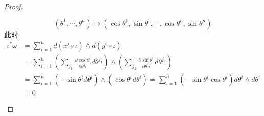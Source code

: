 \documentclass[../main.tex]{subfiles}
\begin{document}
\begin{proof}
\begin{enumerate}
\begin{enumerate}
\[\left(  \theta ^{1},\cdots , \theta ^{n} \right)\mapsto \left( \cos  \theta ^{1},\sin  \theta ^{1},\cdots ,\cos  \theta ^{n},\sin  \theta ^{n} \right)  
\] 此时 \[
\begin{aligned}
\iota ^{*} \omega &=   \sum _{i= 1}^{n}d\left( x^{i}\circ\iota  \right)\wedge d\left( y^{i}\circ \iota  \right)\\ 
 &=    \sum _{i= 1}^{n} \left(\sum _{j_1} \frac{\partial \cos  \theta ^{i}}{\partial  \theta^{j_1}}d  \theta ^{j_1} \right) \wedge \left( \sum _{j_2}  \frac{\partial \sin  \theta ^{i}}{\partial  \theta ^{j_2}}d  \theta ^{j_2} \right) \\ 
  &= \sum _{i= 1}^{n}\left( -\sin  \theta ^{i}d \theta ^{i} \right)\wedge \left( \cos  \theta ^{i}d  \theta ^{i} \right)= \sum _{i= 1}^{n}\left( -\sin  \theta ^{i}\cos  \theta ^{i} \right)d \theta ^{i}\wedge d \theta ^{i} \\ 
   &= 0  
\end{aligned}
\]
    \end{enumerate}


\end{enumerate}
\end{proof}
\end{document}
